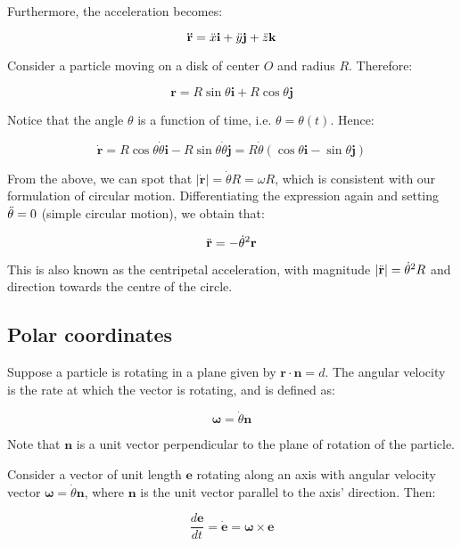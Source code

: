 \documentclass[12pt]{article}
\begin{document}
Furthermore, the acceleration becomes:

\[ \mathbf{\Ddot{r}} = \Ddot{x}\mathbf{i} + \Ddot{y}\mathbf{j} + \Ddot{z}\mathbf{k} \]

\begin{example}
    Consider a particle moving on a disk of center $O$ and radius $R$. Therefore:

    \[ \mathbf{r} = R\sin{\theta}\mathbf{i} + R\cos{\theta}\mathbf{j} \]

    Notice that the angle $\theta$ is a function of time, i.e. $\theta = \theta(t)$. Hence:

    \[ \mathbf{\dot{r}} = R\cos{\theta}\dot{\theta}\mathbf{i} - R\sin{\theta}\dot{\theta}\mathbf{j} = R\dot{\theta}\left(\cos{\theta}\mathbf{i} - \sin{\theta}\mathbf{j}\right) \]

    From the above, we can spot that $|\mathbf{\dot{r}}| = \dot{\theta}R = \omega R$, which is consistent with our formulation of circular motion. Differentiating the expression again and setting $\Ddot{\theta} = 0$ (simple circular motion), we obtain that:

    \[ \Ddot{\mathbf{r}} = -\dot{\theta}^2\mathbf{r} \]

    This is also known as the centripetal acceleration, with magnitude $|\Ddot{\mathbf{r}}| = \dot{\theta}^2R$ and direction towards the centre of the circle.
\end{example}

\subsection{Polar coordinates}

\begin{definition}
    Suppose a particle is rotating in a plane given by $\mathbf{r} \cdot \mathbf{n} = d$. The angular velocity is the rate at which the vector is rotating, and is defined as:

    \[ \mathbf{\omega} = \dot{\theta}\mathbf{n} \]

    Note that $\mathbf{n}$ is a unit vector perpendicular to the plane of rotation of the particle.
\end{definition}

\begin{theorem}
    Consider a vector of unit length $\mathbf{e}$ rotating along an axis with angular velocity vector $\mathbf{\omega} = \dot{\theta}\mathbf{n}$, where $\mathbf{n}$ is the unit vector parallel to the axis' direction. Then:

    \[ \frac{d\mathbf{e}}{dt} = \dot{\mathbf{e}} =  \mathbf{\omega} \times \mathbf{e}\]
\end{theorem}
\end{document}
